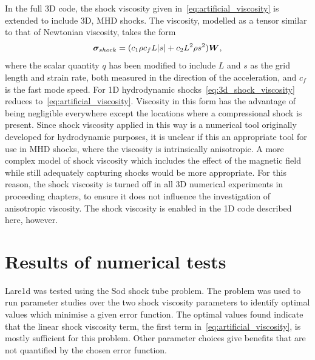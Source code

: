 In the full 3D code, the shock viscosity given in~\eqref{eq:artificial_viscosity} is extended to include 3D, MHD shocks. The viscosity, modelled as a tensor similar to that of Newtonian viscosity, takes the form
\begin{equation}
  \label{eq:3d_shock_viscosity}
{\bm \sigma}_{shock} = (c_1 \rho c_f L |s| + c_2 L^2 \rho s^2) {\bm W},
\end{equation}
where the scalar quantity $q$ has been modified to include $L$ and $s$ as the grid length and strain rate, both measured in the direction of the acceleration, and $c_f$ is the fast mode speed. For 1D hydrodynamic shocks~\eqref{eq:3d_shock_viscosity} reduces to~\eqref{eq:artificial_viscosity}. Viscosity in this form has the advantage of being negligible everywhere except the locations where a compressional shock is present. Since shock viscosity applied in this way is a numerical tool originally developed for hydrodynamic purposes, it is unclear if this an appropriate tool for use in MHD shocks, where the viscosity is intrinsically anisotropic. A more complex model of shock viscosity which includes the effect of the magnetic field while still adequately capturing shocks would be more appropriate. For this reason, the shock viscosity is turned off in all 3D numerical experiments in proceeding chapters, to ensure it does not influence the investigation of anisotropic viscosity. The shock viscosity is enabled in the 1D code described here, however.

\section{Results of numerical tests}

Lare1d was tested using the Sod shock tube problem. The problem was used to run parameter studies over the two shock viscosity parameters to identify optimal values which minimise a given error function. The optimal values found indicate that the linear shock viscosity term, the first term in~\eqref{eq:artificial_viscosity}, is mostly sufficient for this problem. Other parameter choices give benefits that are not quantified by the chosen error function.

